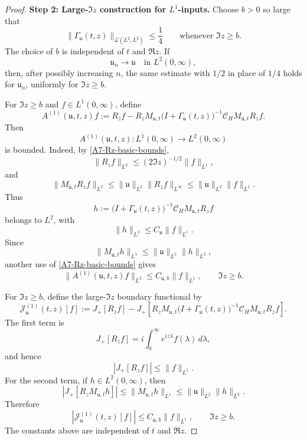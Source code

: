 \documentclass[10pt]{article}
\numberwithin{equation}{section}
\numberwithin{theorem}{section}
\begin{document}
\begin{appendix}
\begin{proof}
\medskip
\noindent
\textbf{Step 2: Large-\(\Im z\) construction for \(L^1\)-inputs.}
Choose \(b>0\) so large that
\begin{equation}
\label{A7-large-im-smallness}
\|\Gamma_{\mathfrak u}(t,z)\|_{\mathcal L(L^2,L^2)}
\le
\frac14
\qquad
\text{whenever }\Im z\ge b.
\end{equation}
The choice of \(b\) is independent of \(t\) and \(\Re z\). If
\[
\mathfrak u_n\to\mathfrak u
\quad\text{in }L^2(0,\infty),
\]
then, after possibly increasing \(n\), the same estimate with \(1/2\) in place
of \(1/4\) holds for \(\mathfrak u_n\), uniformly for \(\Im z\ge b\).

For \(\Im z\ge b\) and \(f\in L^1(0,\infty)\), define
\begin{equation}
\label{A7-A1-large-def}
A^{(1)}(\mathfrak u,t,z)f
:=
R_zf
-
R_zM_{\mathfrak u,t}
\bigl(I+\Gamma_{\mathfrak u}(t,z)\bigr)^{-1}
\mathcal C_HM_{\overline{\mathfrak u},t}R_zf .
\end{equation}
Then
\[
A^{(1)}(\mathfrak u,t,z):L^1(0,\infty)\to L^2(0,\infty)
\]
is bounded. Indeed, by \eqref{A7-Rz-basic-bounds},
\[
\|R_zf\|_{L^2}\le (2\Im z)^{-1/2}\|f\|_{L^1},
\]
and
\[
\|M_{\overline{\mathfrak u},t}R_zf\|_{L^2}
\le
\|\mathfrak u\|_{L^2}\|R_zf\|_{L^\infty}
\le
\|\mathfrak u\|_{L^2}\|f\|_{L^1}.
\]
Thus
\[
h:=
\bigl(I+\Gamma_{\mathfrak u}(t,z)\bigr)^{-1}
\mathcal C_HM_{\overline{\mathfrak u},t}R_zf
\]
belongs to \(L^2\), with
\[
\|h\|_{L^2}\le C_{\mathfrak u}\|f\|_{L^1}.
\]
Since
\[
\|M_{\mathfrak u,t}h\|_{L^1}
\le
\|\mathfrak u\|_{L^2}\|h\|_{L^2},
\]
another use of \eqref{A7-Rz-basic-bounds} gives
\begin{equation}
\label{A7-A1-large-bound}
\|A^{(1)}(\mathfrak u,t,z)f\|_{L^2}
\le
C_{\mathfrak u,b}\|f\|_{L^1},
\qquad \Im z\ge b.
\end{equation}

For \(\Im z\ge b\), define the large-\(\Im z\) boundary functional by
\begin{equation}
\label{A7-J1-large-def}
\mathcal J^{(1)}_{\mathfrak u}(t,z)[f]
:=
J_+[R_zf]
-
J_+\left[
R_zM_{\mathfrak u,t}
\bigl(I+\Gamma_{\mathfrak u}(t,z)\bigr)^{-1}
\mathcal C_HM_{\overline{\mathfrak u},t}R_zf
\right].
\end{equation}
The first term is
\[
J_+[R_zf]
=
i\int_0^\infty e^{iz\lambda}f(\lambda)\,d\lambda,
\]
and hence
\begin{equation}
\label{A7-free-boundary-L1}
|J_+[R_zf]|
\le
\|f\|_{L^1}.
\end{equation}
For the second term, if \(h\in L^2(0,\infty)\), then
\begin{equation}
\label{A7-JRMu-bound}
|J_+[R_zM_{\mathfrak u,t}h]|
\le
\|M_{\mathfrak u,t}h\|_{L^1}
\le
\|\mathfrak u\|_{L^2}\|h\|_{L^2}.
\end{equation}
Therefore
\begin{equation}
\label{A7-J1-large-bound}
|\mathcal J^{(1)}_{\mathfrak u}(t,z)[f]|
\le
C_{\mathfrak u,b}\|f\|_{L^1},
\qquad \Im z\ge b.
\end{equation}
The constants above are independent of \(t\) and \(\Re z\).


\end{proof}
\end{appendix}
\end{document}
